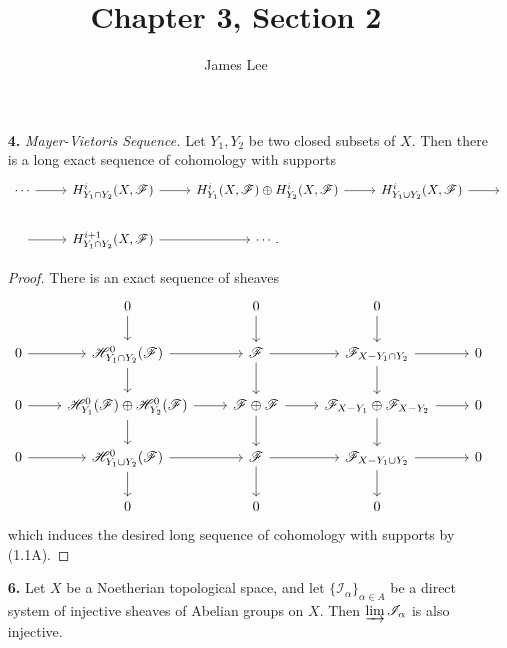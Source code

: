 \documentclass{article}
\title{Chapter 3, Section 2}
\author{James Lee}
\newcommand{\fF}{\mathscr{F}}
\newcommand{\fI}{\mathscr{I}}
\newcommand{\fH}{\mathscr{H}}
\begin{document}
\maketitle
\begin{enumerate} [label=\textbf{\arabic*.}, leftmargin=0em]
\item[\textbf{4.}] \textit{Mayer-Vietoris Sequence.} Let $Y_1, Y_2$ be two closed subsets of $X$. Then there is a long exact sequence of cohomology with supports
\[ \begin{tikzcd}
    \cdots \arrow[r] & {H^i_{Y_1 \cap Y_2}(X, \fF)} \arrow[r]       & {H_{Y_1}^i(X, \fF) \oplus H_{Y_2}^i(X, \fF)} \arrow[r] & {H^i_{Y_1 \cup Y_2}(X, \fF)} \arrow[r] & {} \\
    {} \arrow[r]     & {H^{i + 1}_{Y_1 \cap Y_2}(X, \fF)} \arrow[r] & \cdots .                                               &                                        &   
\end{tikzcd} \] 

\begin{proof}
    There is an exact sequence of sheaves
    \[ \begin{tikzcd}
        & 0 \arrow[d]                                                  & 0 \arrow[d]                        & 0 \arrow[d]                                            &   \\
0 \arrow[r] & \fH^0_{Y_1 \cap Y_2}(\fF) \arrow[r] \arrow[d]                & \fF \arrow[r] \arrow[d]            & \fF_{X - Y_1 \cap Y_2} \arrow[r] \arrow[d]             & 0 \\
0 \arrow[r] & \fH_{Y_1}^0(\fF) \oplus \fH_{Y_2}^0(\fF) \arrow[d] \arrow[r] & \fF \oplus \fF \arrow[d] \arrow[r] & \fF_{X - Y_1} \oplus \fF_{X - Y_2} \arrow[d] \arrow[r] & 0 \\
0 \arrow[r] & \fH^0_{Y_1 \cup Y_2}(\fF) \arrow[d] \arrow[r]                & \fF \arrow[d] \arrow[r]            & \fF_{X - Y_1 \cup Y_2} \arrow[d] \arrow[r]             & 0 \\
        & 0                                                            & 0                                  & 0                                                      &  
\end{tikzcd} \]
which induces the desired long sequence of cohomology with supports by (1.1A).
\end{proof}

\item[\textbf{6.}] Let $X$ be a Noetherian topological space, and let $\{ \fI_\alpha \}_{\alpha \in A}$ be a direct system of injective sheaves of Abelian groups on $X$. Then $\varinjlim \fI _\alpha$ is also injective.


\end{enumerate}
\end{document}
